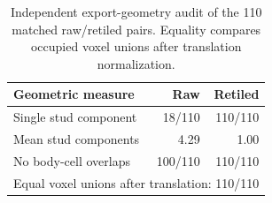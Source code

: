 \begin{table}[t]
\centering\small
\begin{tabular}{lrr}
\toprule
Geometric measure & Raw & Retiled \\
\midrule
Single stud component & 18/110 & 110/110 \\
Mean stud components & 4.29 & 1.00 \\
No body-cell overlaps & 100/110 & 110/110 \\
\midrule
\multicolumn{3}{l}{Equal voxel unions after translation: 110/110} \\
\bottomrule
\end{tabular}
\caption{Independent export-geometry audit of the 110 matched raw/retiled pairs. Equality compares occupied voxel unions after translation normalization.}
\label{tab:reconstruction-geometry}
\end{table}
